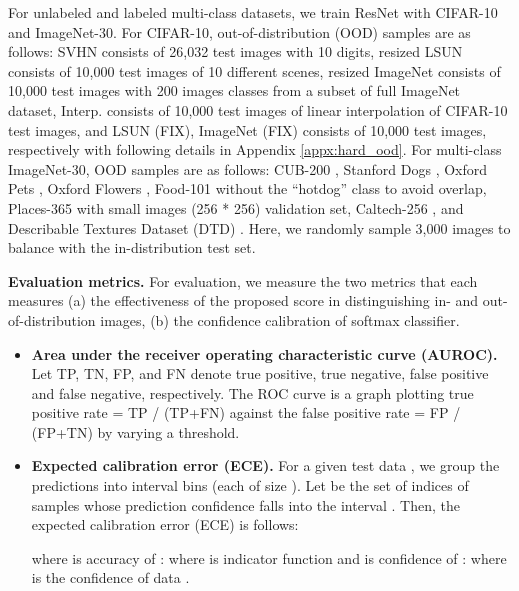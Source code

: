 \documentclass{article}
\begin{document}
For unlabeled and labeled multi-class datasets, we train ResNet with CIFAR-10 and ImageNet-30. For CIFAR-10, out-of-distribution (OOD) samples are as follows: SVHN \citep{netzer2011reading} consists of 26,032 test images with 10 digits, resized LSUN \citep{liang2018enhancing} consists of 10,000 test images of 10 different scenes, resized ImageNet \citep{liang2018enhancing} consists of 10,000 test images with 200 images classes from a subset of full ImageNet dataset, Interp. consists of 10,000 test images of linear interpolation of CIFAR-10 test images, and LSUN (FIX), ImageNet (FIX) consists of 10,000 test images, respectively with following details in Appendix \ref{appx:hard_ood}. For multi-class ImageNet-30, OOD samples are as follows: CUB-200 \citep{welinder2010caltech}, Stanford Dogs \citep{khosla2011novel}, Oxford Pets \citep{parkhi2012cats}, Oxford Flowers \citep{nilsback2006visual}, Food-101 \citep{bossard2014food} without the ``hotdog'' class to avoid overlap, Places-365 \citep{zhou2017places} with small images (256 * 256) validation set, Caltech-256 \citep{griffin2007caltech}, and Describable Textures Dataset (DTD) \citep{cimpoi2014describing}. Here, we randomly sample 3,000 images to balance with the in-distribution test set. 



\textbf{Evaluation metrics.} 
For evaluation, we measure the two metrics that each measures (a) the effectiveness of the proposed score in distinguishing in- and out-of-distribution images, (b) the confidence calibration of softmax classifier. 

\begin{itemize}
\item \textbf{Area under the receiver operating characteristic curve (AUROC).} Let TP, TN, FP, and FN denote true positive, true negative, false positive and false negative, respectively. The ROC curve is a graph plotting true positive rate = TP / (TP+FN) against the false positive rate = FP / (FP+TN) by varying a threshold.
\item \textbf{Expected calibration error (ECE).} For a given test data , we group the predictions into  interval bins (each of size ). Let  be the set of indices of samples whose prediction confidence falls into the interval . Then, the expected calibration error (ECE) \citep{naeini2015obtaining, guo2017calibration} is follows:

where  is accuracy of :  where  is indicator function and  is confidence of :  where  is the confidence of data . 
\end{itemize}
\end{document}
